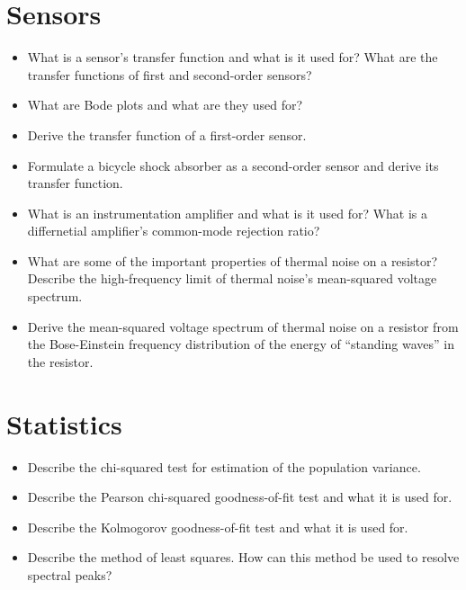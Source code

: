 \section{Sensors}
\begin{itemize}

    \item What is a sensor's transfer function and what is it used for?
    What are the transfer functions of first and second-order sensors?

    \item What are Bode plots and what are they used for?

    \item Derive the transfer function of a first-order sensor.

    \item Formulate a bicycle shock absorber as a second-order sensor and derive its transfer function.

    \item What is an instrumentation amplifier and what is it used for?
    What is a differnetial amplifier's common-mode rejection ratio?

    \item What are some of the important properties of thermal noise on a resistor?
    Describe the high-frequency limit of thermal noise's mean-squared voltage spectrum.
    
    \item Derive the mean-squared voltage spectrum of thermal noise on a resistor from the Bose-Einstein frequency distribution of the energy of ``standing waves'' in the resistor.

\end{itemize}

\section{Statistics}
\begin{itemize}

    \item Describe the chi-squared test for estimation of the population variance.

    \item Describe the Pearson chi-squared goodness-of-fit test and what it is used for.

    \item Describe the Kolmogorov goodness-of-fit test and what it is used for.

    \item Describe the method of least squares.
    How can this method be used to resolve spectral peaks?

\end{itemize}


